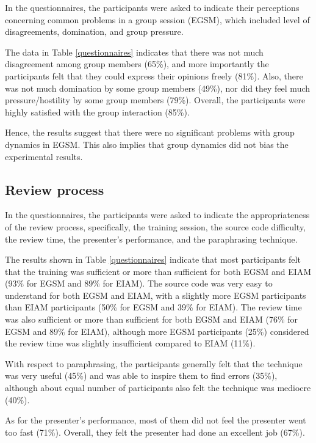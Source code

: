 In the questionnaires, the participants were asked to indicate their
perceptions concerning common problems in a group session (EGSM),
which included level of disagreements, domination, and group pressure.

The data in Table \ref{questionnaires} indicates that there was not
much disagreement among group members (65\%),
and more importantly  the participants felt that they could express
their opinions freely (81\%). Also, there was not much
domination by some group members (49\%), nor did they feel much
pressure/hostility by some group members (79\%). Overall, the
participants were highly satisfied with the group interaction (85\%).

Hence, the results suggest that there were no significant
problems with group dynamics in EGSM. This also implies that 
group dynamics did not bias the experimental results.


\subsection {Review process}
In the questionnaires, the participants were asked to indicate the
appropriateness of the review process, specifically, 
the training session, the source code difficulty,
the review time, the presenter's performance, and the paraphrasing
technique.

The results shown in Table \ref{questionnaires} indicate that most
participants felt that the training was sufficient or more than
sufficient for both EGSM and EIAM (93\% for EGSM and 89\% for EIAM).
The source code was very easy to understand for both
EGSM and EIAM, with a slightly more
EGSM participants  than EIAM participants (50\% for EGSM and
39\% for EIAM). 
The review time was also sufficient or more than sufficient for both
EGSM and EIAM (76\% for EGSM and 89\% for EIAM),
although more EGSM participants (25\%) considered the review
time was slightly insufficient compared to EIAM (11\%).

With respect to paraphrasing, the participants generally 
felt that the technique was very useful (45\%) and was able to inspire
them to find errors (35\%), although about equal number of
participants also felt the technique was mediocre (40\%).

As for the
presenter's performance, most of them did not feel the presenter went
too fast (71\%). Overall, they felt the presenter had done an
excellent job (67\%).


